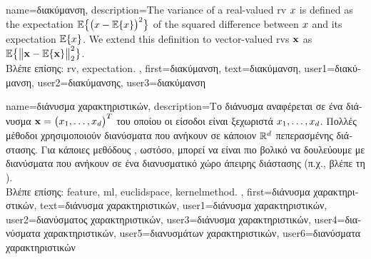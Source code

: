 {
	name={\foreignlanguage{greek}{διακύμανση}},
	description={The variance of a real-valued \gls{rv} $x$ is defined as the \gls{expectation} 
		$\mathbb{E}\big\{ \big( x - \mathbb{E}\{x \} \big)^{2} \big\}$ of the squared difference between $x$ 
		and its \gls{expectation} $\mathbb{E}\{x \}$. We extend this definition to vector-valued \gls{rv}s ${\bf x}$ 
		as $\mathbb{E}\big\{ \big\| {\bf x} - \mathbb{E}\{{\bf x} \} \big\|_{2}^{2} \big\}$.\\
		\foreignlanguage{greek}{Βλέπε επίσης:} \gls{rv}, \gls{expectation}.} ,
		first={\foreignlanguage{greek}{διακύμανση}},
		text={\foreignlanguage{greek}{διακύμανση}},
		user1={\foreignlanguage{greek}{διακύμανση}}, %
   		user2={\foreignlanguage{greek}{διακύμανσης}}, %
		user3={\foreignlanguage{greek}{διακύμανση}} %
}

{name={\foreignlanguage{greek}{διάνυσμα χαρακτηριστικών}},
	description={\foreignlanguage{greek}{Το διάνυσμα}  
	\foreignlanguage{greek}{αναφέρεται σε ένα διάνυσμα ${\bf x} = \big(x_{1},\ldots,x_{d}\big)^{T}$ 
	του οποίου οι είσοδοι είναι ξεχωριστά}  $x_{1},\ldots,x_{d}$. 
	\foreignlanguage{greek}{Πολλές μέθοδοι}  \foreignlanguage{greek}{χρησιμοποιούν διανύσματα} 
	 \foreignlanguage{greek}{που ανήκουν σε κάποιον}  $\mathbb{R}^{d}$
	\foreignlanguage{greek}{πεπερασμένης διάστασης. Για κάποιες μεθόδους} 
	, \foreignlanguage{greek}{ωστόσο, μπορεί να είναι πιο βολικό να δουλεύουμε με διανύσματα}  
	\foreignlanguage{greek}{που ανήκουν σε ένα διανυσματικό χώρο άπειρης διάστασης (π.χ., βλέπε τη} ).\\
	\foreignlanguage{greek}{Βλέπε επίσης:} \gls{feature}, \gls{ml}, \gls{euclidspace}, \gls{kernelmethod}.
		}, first={\foreignlanguage{greek}{διάνυσμα χαρακτηριστικών}},
		text={\foreignlanguage{greek}{διάνυσμα χαρακτηριστικών}},
		user1={\foreignlanguage{greek}{διάνυσμα χαρακτηριστικών}}, %
  		user2={\foreignlanguage{greek}{διανύσματος χαρακτηριστικών}}, %
		user3={\foreignlanguage{greek}{διάνυσμα χαρακτηριστικών}}, %
		user4={\foreignlanguage{greek}{διανύσματα χαρακτηριστικών}}, %
  		user5={\foreignlanguage{greek}{διανυσμάτων χαρακτηριστικών}}, %
		user6={\foreignlanguage{greek}{διανύσματα χαρακτηριστικών}} %
}

